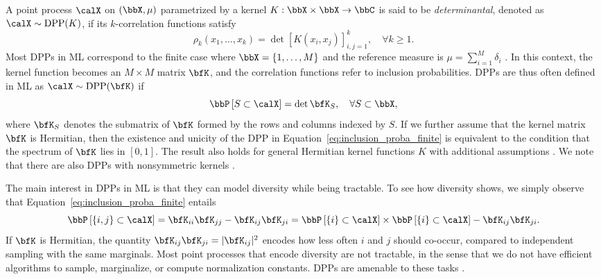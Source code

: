 \documentclass[twoside,11pt]{article}
\newcommand\DPP{\operatorname{DPP}}
\newcommand*{\Eqref}[1]{Equation~\ref{#1}}
\newcommand{\lrb}[1]{\left[ #1 \right]}
\newcommand{\lrcb}[1]{\left\{ #1 \right\}}
\newcommand\Prob{\operatorname{\bbP}}
\newcommand{\Proba}[1]{\Prob\lrb{#1}}
\begin{document}
	A point process $\calX$ on $(\bbX,\mu)$ parametrized by a kernel $K:\bbX\times \bbX\rightarrow \bbC$ is said to be \emph{determinantal}, denoted as $\calX\sim\DPP(K)$, if its $k$-correlation functions satisfy
	  \begin{equation*}
	  \label{eq:k-correlation_function_DPP}
	    \rho_k(x_1,\dots,x_k)
	      = \det \lrb{K(x_i, x_j)}_{i,j=1}^k,
	    \quad \forall k\geq 1.
	  \end{equation*}
		Most DPPs in ML correspond to the finite case where $\bbX = \lrcb{1,\dots,M}$ and the reference measure is $\mu=\sum_{i=1}^M \delta_i$ \citep{KuTa12}.
		In this context, the kernel function becomes an $M\times M$ matrix $\bfK$, and the correlation functions refer to inclusion probabilities.
	DPPs are thus often defined in ML as $\calX\sim \DPP(\bfK)$ if
	  \begin{equation}
	  \label{eq:inclusion_proba_finite}
	    \Proba{S \subset \calX} = \det {\bfK}_S,
	      \quad\forall S\subset \bbX,
	  \end{equation}
	where ${\bfK}_S$ denotes the submatrix of $\bfK$ formed by the rows and columns indexed by $S$.
	If we further assume that the kernel matrix $\bfK$ is Hermitian, then the existence and unicity of the DPP in \Eqref{eq:inclusion_proba_finite} is equivalent to the condition that the spectrum of $\bfK$ lies in $[0,1]$.
	The result also holds for general Hermitian kernel functions $K$ with additional assumptions \cite[Theorem 3]{Sos00}.
	We note that there are also DPPs with nonsymmetric kernels \citep{BoDiFu10}.

	The main interest in DPPs in ML is that they can model diversity while being tractable.
	To see how diversity shows, we simply observe that \Eqref{eq:inclusion_proba_finite} entails
	\begin{equation*}
	\label{eq:2point_correlation_function_inclusion_proba_finite_case}
	  \Proba{\{i,j\} \subset \calX} 
	    = {\bfK}_{ii}{\bfK}_{jj}-{\bfK}_{ij}{\bfK}_{ji} 
	    = \Proba{\{i\} \subset \calX}
	      \times \Proba{\{i\} \subset \calX} 
	        - {\bfK}_{ij}{\bfK}_{ji}.
	\end{equation*}
	If $\bfK$ is Hermitian, the quantity ${\bfK}_{ij}{\bfK}_{ji} = \vert{\bfK}_{ij}\vert^2$ encodes how less often $i$ and $j$ should co-occur, compared to independent sampling with the same marginals.
	Most point processes that encode diversity are not tractable, in the sense that we do not have efficient algorithms to sample, marginalize, or compute normalization constants.
	DPPs are amenable to these tasks \citep{KuTa12}.
\end{document}
